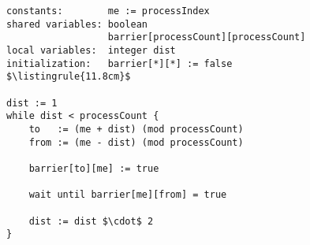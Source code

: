 \begin{center}
\begin{minipage}{\textwidth}
\begin{lstlisting}[mathescape, linewidth=11.8cm]
constants:        me := processIndex
shared variables: boolean
                  barrier[processCount][processCount]
local variables:  integer dist
initialization:   barrier[*][*] := false
$\listingrule{11.8cm}$

dist := 1
while dist < processCount {
	to   := (me + dist) (mod processCount)
	from := (me - dist) (mod processCount)
	
	barrier[to][me] := true
	
	wait until barrier[me][from] = true

	dist := dist $\cdot$ 2
}
\end{lstlisting}
\end{minipage}
\end{center}
